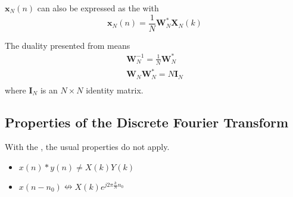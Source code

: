 $\mathbf{x}_{N}(n)$ can also be expressed as the  with 
\begin{equation}\label{eq:IDFT_Matrix_Complex_Conjugate}
  \mathbf{x}_{N}(n) = \frac{1}{N} \mathbf{W}_{N}^{*} \mathbf{X}_{N}(k)
\end{equation}

The duality presented from  means
\begin{equation}\label{eq:DFT_W_Matrix_Unitary}
  \begin{aligned}
    \mathbf{W}_{N}^{-1} = \frac{1}{N} \mathbf{W}_{N}^{*} \\
    \mathbf{W}_{N} \mathbf{W}_{N}^{*} = N \mathbf{I}_{N} \\
  \end{aligned}
\end{equation}
where $\mathbf{I}_{N}$ is an $N \times N$ identity matrix.

\subsection{Properties of the Discrete Fourier Transform}\label{subsec:DFT_Properties}
With the , the usual properties do not apply.
\begin{itemize}[noitemsep]
\item $x(n) * y(n) \neq X(k)Y(k)$
\item $x(n-n_{0}) \nleftrightarrow X(k) e^{j 2\pi \frac{k}{N} n_{0}}$
\end{itemize}

